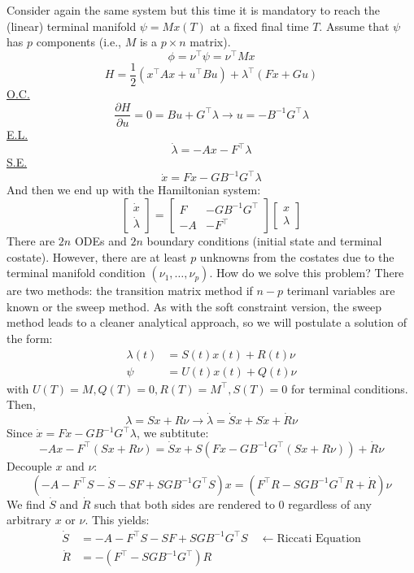 \documentclass{article}
\begin{document}
Consider again the same system but this time it is mandatory to reach the (linear) terminal manifold
$\psi = Mx(T)$ at a fixed final time $T$. Assume that $\psi$ has $p$ components (i.e., $M$ is
a $p \times n$ matrix).
\[\phi = \nu^\top\psi = \nu^\top Mx\]
\[H = \frac{1}{2}(x^\top Ax + u^\top Bu) + \lambda^\top(Fx+Gu)\]
\underline{O.C.}
\[\frac{\partial H}{\partial u} = 0 = Bu + G^\top\lambda \rightarrow u = -B^{-1}G^\top\lambda\]
\underline{E.L.}
\[\dot{\lambda} = -Ax - F^\top\lambda\]
\underline{S.E.}
\[\dot{x} = Fx-GB^{-1}G^\top\lambda\]
And then we end up with the Hamiltonian system:
\[\left[\begin{matrix}
    \dot{x} \\ \dot{\lambda}
\end{matrix}\right] = \left[\begin{matrix}
    F & -GB^{-1}G^\top \\
    -A & -F^\top
\end{matrix}\right]\left[\begin{matrix}
    x \\ \lambda
\end{matrix}\right]\]
There are $2n$ ODEs and $2n$ boundary conditions (initial state and terminal costate).
However, there are at least $p$ unknowns from the costates due to the terminal manifold condition
$(\nu_1,\ldots,\nu_p)$. How do we solve this problem? There are two methods:
the transition matrix method if $n-p$ terimanl variables are known or the sweep method.
As with the soft constraint version, the sweep method leads to a cleaner analytical approach,
so we will postulate a solution of the form:
\begin{align*}
    \lambda(t) &= S(t)x(t) + R(t)\nu \\
    \psi &= U(t)x(t) + Q(t)\nu
\end{align*}
with $U(T) = M, Q(T) = 0, R(T) = M^\top, S(T) = 0$ for terminal conditions.
Then,
\[\lambda = Sx + R\nu \rightarrow \dot{\lambda} = \dot{S}x + S\dot{x} + \dot{R}\nu\]
Since $\dot{x} = Fx-GB^{-1}G^\top\lambda$, we subtitute:
\[-Ax-F^\top(Sx+R\nu) = \dot{S}x + S(Fx-GB^{-1}G^\top(Sx+R\nu)) + \dot{R}\nu\]
Decouple $x$ and $\nu$:
\[(-A-F^\top S-\dot{S}-SF+SGB^{-1}G^\top S)x = (F^\top R-SGB^{-1}G^\top R+\dot{R})\nu\]
We find $\dot{S}$ and $\dot{R}$ such that both sides are rendered to 0 regardless
of any arbitrary $x$ or $\nu$. This yields:
\begin{align*}
    \dot{S} &= -A-F^\top S - SF + SGB^{-1}G^\top S \quad\leftarrow\text{Riccati Equation} \\
    \dot{R} &= -(F^\top - SGB^{-1}G^\top)R
\end{align*}
\end{document}
